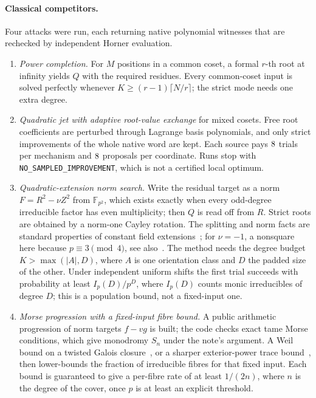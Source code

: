 \documentclass[10pt]{article}
\begin{document}
\paragraph{Classical competitors.} Four attacks were run, each returning native polynomial witnesses that are rechecked by independent Horner evaluation.
\begin{enumerate}
\item \emph{Power completion.} For $M$ positions in a common coset, a formal $r$-th root at infinity yields $Q$ with the required residues. Every common-coset input is solved perfectly whenever $K \ge (r-1)\lceil N/r \rceil$; the strict mode needs one extra degree.
\item \emph{Quadratic jet with adaptive root-value exchange} for mixed cosets. Free root coefficients are perturbed through Lagrange basis polynomials, and only strict improvements of the whole native word are kept. Each source pays $8$ trials per mechanism and $8$ proposals per coordinate. Runs stop with \texttt{NO\_SAMPLED\_IMPROVEMENT}, which is not a certified local optimum.
\item \emph{Quadratic-extension norm search.} Write the residual target as a norm $F = R^2 - \nu Z^2$ from $\mathbb{F}_{p^2}$, which exists exactly when every odd-degree irreducible factor has even multiplicity; then $Q$ is read off from $R$. Strict roots are obtained by a norm-one Cayley rotation. The splitting and norm facts are standard properties of constant field extensions~\cite{Rosen2002}; for $\nu=-1$, a nonsquare here because $p \equiv 3 \pmod 4$, see also~\cite{KuoLiuTotani2026}. The method needs the degree budget $K > \max(|A|, D)$, where $A$ is one orientation class and $D$ the padded size of the other. Under independent uniform shifts the first trial succeeds with probability at least $I_p(D)/p^D$, where $I_p(D)$ counts monic irreducibles of degree $D$; this is a population bound, not a fixed-input one.
\item \emph{Morse progression with a fixed-input fibre bound.} A public arithmetic progression of norm targets $f - v g$ is built; the code checks exact tame Morse conditions, which give monodromy $S_n$ under the note's argument. A Weil bound on a twisted Galois closure~\cite{BankBarySorokerRosenzweig2013}, or a sharper exterior-power trace bound~\cite{FouvryKowalskiMichel2014}, then lower-bounds the fraction of irreducible fibres for that fixed input. Each bound is guaranteed to give a per-fibre rate of at least $1/(2n)$, where $n$ is the degree of the cover, once $p$ is at least an explicit threshold.
\end{enumerate}
\end{document}
